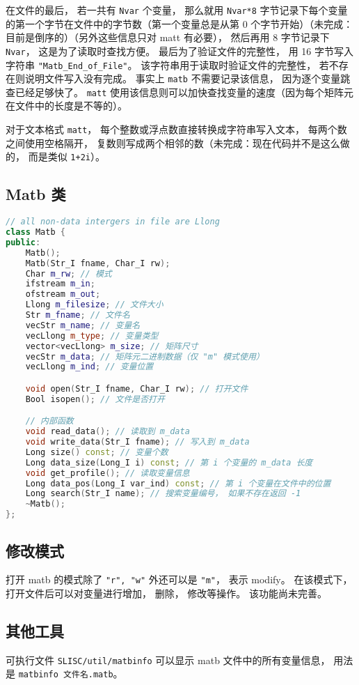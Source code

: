 在文件的最后， 若一共有 \verb|Nvar| 个变量， 那么就用 \verb|Nvar*8| 字节记录下每个变量的第一个字节在文件中的字节数（第一个变量总是从第 0 个字节开始）（未完成：目前是倒序的）（另外这些信息只对 matt 有必要）， 然后再用 8 字节记录下 \verb|Nvar|， 这是为了读取时查找方便。 最后为了验证文件的完整性， 用 16 字节写入字符串 \verb|"Matb_End_of_File"|。 该字符串用于读取时验证文件的完整性， 若不存在则说明文件写入没有完成。 事实上 \verb|matb| 不需要记录该信息， 因为逐个变量跳查已经足够快了。 \verb|matt| 使用该信息则可以加快查找变量的速度（因为每个矩阵元在文件中的长度是不等的）。

对于文本格式 \verb|matt|， 每个整数或浮点数直接转换成字符串写入文本， 每两个数之间使用空格隔开， 复数则写成两个相邻的数（未完成：现在代码并不是这么做的， 而是类似 \verb|1+2i|）。

\subsection{Matb 类}
\begin{lstlisting}[language=cpp]
// all non-data intergers in file are Llong
class Matb {
public:
    Matb();
    Matb(Str_I fname, Char_I rw);
    Char m_rw; // 模式
    ifstream m_in;
    ofstream m_out;
    Llong m_filesize; // 文件大小
    Str m_fname; // 文件名
    vecStr m_name; // 变量名
    vecLlong m_type; // 变量类型
    vector<vecLlong> m_size; // 矩阵尺寸
    vecStr m_data; // 矩阵元二进制数据（仅 "m" 模式使用）
    vecLlong m_ind; // 变量位置

    void open(Str_I fname, Char_I rw); // 打开文件
    Bool isopen(); // 文件是否打开

    // 内部函数
    void read_data(); // 读取到 m_data
    void write_data(Str_I fname); // 写入到 m_data
    Long size() const; // 变量个数
    Long data_size(Long_I i) const; // 第 i 个变量的 m_data 长度
    void get_profile(); // 读取变量信息
    Long data_pos(Long_I var_ind) const; // 第 i 个变量在文件中的位置
    Long search(Str_I name); // 搜索变量编号， 如果不存在返回 -1
    ~Matb();
};
\end{lstlisting}

\subsection{修改模式}
打开 matb 的模式除了 \verb|"r", "w"| 外还可以是 \verb|"m"|， 表示 modify。 在该模式下， 打开文件后可以对变量进行增加， 删除， 修改等操作。 该功能尚未完善。

\subsection{其他工具}
可执行文件 \verb|SLISC/util/matbinfo| 可以显示 matb 文件中的所有变量信息， 用法是 \verb|matbinfo 文件名.matb|。


